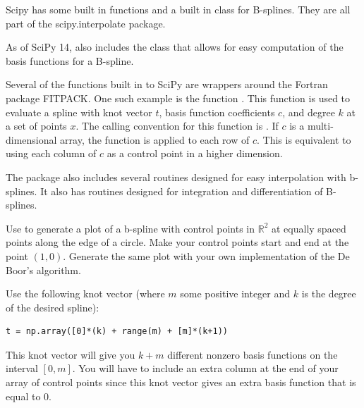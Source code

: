 Scipy has some built in functions and a built in class for B-splines.
They are all part of the scipy.interpolate package.

As of SciPy 14,  also includes the  class that allows for easy computation of the basis functions for a B-spline.

Several of the functions built in to SciPy are wrappers around the Fortran package FITPACK.
One such example is the function .
This function is used to evaluate a spline with knot vector $t$, basis function coefficients $c$, and degree $k$ at a set of points $x$.
The calling convention for this function is .
If $c$ is a multi-dimensional array, the function is applied to each row of $c$.
This is equivalent to using each column of $c$ as a control point in a higher dimension.

The package  also includes several routines designed for easy interpolation with b-splines.
It also has routines designed for integration and differentiation of B-splines.

\begin{problem}
Use  to generate a plot of a b-spline with control points in $\mathbb{R}^2$ at equally spaced points along the edge of a circle.
Make your control points start and end at the point $\left(1, 0\right)$.
Generate the same plot with your own implementation of the De Boor's algorithm.

Use the following knot vector (where $m$ some positive integer and $k$ is the degree of the desired spline):
\begin{lstlisting}
t = np.array([0]*(k) + range(m) + [m]*(k+1))
\end{lstlisting}
This knot vector will give you $k + m$ different nonzero basis functions on the interval $\left[0, m\right]$.
You will have to include an extra column at the end of your array of control points since this knot vector gives an extra basis function that is equal to $0$.
\end{problem}
